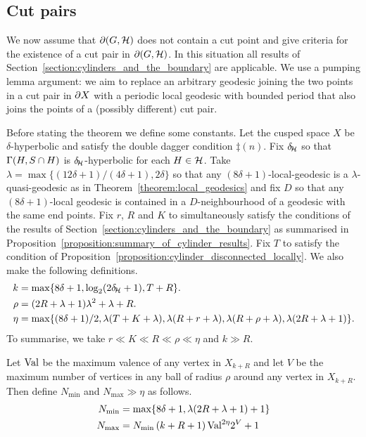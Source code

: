 \subsection{Cut pairs}\label{section:detecting_cut_pairs}

We now assume that $\partial(G,\mathcal{H})$ does not contain a cut point and give criteria for the existence of a cut pair in $\partial(G, \mathcal{H})$.
In this situation all results of Section~\ref{section:cylinders_and_the_boundary} are applicable.
We use a pumping lemma argument: we aim to replace an arbitrary geodesic joining the two points in a cut pair in $\partial X$ with a periodic local geodesic with bounded period that also joins the points of a (possibly different) cut pair.

Before stating the theorem we define some constants. 
Let the cusped space $X$ be $\delta$-hyperbolic and satisfy the double dagger condition $\ddag(n)$.
Fix $\delta\kern-2pt_{\mathcal{H}}$ so that $\operatorname{\Gamma}(H,S\cap H)$ is $\delta\kern-2pt_{\mathcal{H}}$-hyperbolic for each $H \in \mathcal{H}$.
Take $\lambda = \max\{(12\delta+1)/(4\delta+1), 2\delta\}$ so that any $(8\delta+1)$-local-geodesic is a $\lambda$-quasi-geodesic as in Theorem~\ref{theorem:local_geodesics} and fix $D$ so that any $(8\delta+1)$-local geodesic is contained in a $D$-neighbourhood of a geodesic with the same end points.
Fix $r$, $R$ and $K$ to simultaneously satisfy the conditions of the results of Section~\ref{section:cylinders_and_the_boundary} as summarised in Proposition~\ref{proposition:summary_of_cylinder_results}.
Fix $T$ to satisfy the condition of Proposition~\ref{proposition:cylinder_disconnected_locally}. 
We also make the following definitions.
\begin{align}
     k &= \max\{8\delta + 1, \log_2(2\delta\kern-2pt_{\mathcal{H}} + 1), T + R\}.\\
  \rho &= (2R + \lambda + 1)\lambda^2 + \lambda + R.\\
  \eta &= \max\{(8\delta + 1)/2, \lambda(T + K + \lambda), \lambda(R + r + \lambda), \lambda(R + \rho + \lambda), \lambda(2R + \lambda + 1)\}.
\end{align}
To summarise, we take $r \ll K \ll R \ll \rho \ll \eta$ and $k \gg R$.

Let $\mathrm{Val}$ be the maximum valence of any vertex in $X_{k + R}$ and let $V$ be the maximum number of vertices in any ball of radius $\rho$ around any vertex in $X_{k + R}$. 
Then define $N_{\min}$ and $N_{\max} \gg \eta$ as follows.
\begin{align}
  N_\text{min} &= \max\{8\delta+1, \lambda(2R+\lambda+1) + 1\}\\
  N_\text{max} &= N_\text{min} \left(k + R + 1\right) \mathrm{Val}^{2\eta} 2^V + 1
\end{align}

